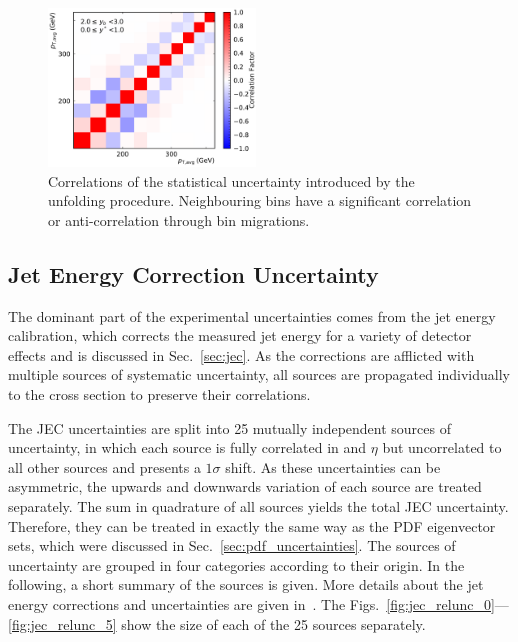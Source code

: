 \begin{figure}[htbp]
    \includegraphics[width=0.49\textwidth]{figures/measurement/unf_nlo_corr_yb2ys0.pdf}
    \caption[Correlations of statistical uncertainty]{Correlations of the
        statistical uncertainty introduced by the unfolding procedure.
        Neighbouring bins have a significant correlation or anti-correlation
        through bin migrations.}
    \label{fig:corr_unfolding_nlo}
\end{figure}

\subsection{Jet Energy Correction Uncertainty}

The dominant part of the experimental uncertainties comes from the jet energy
calibration, which corrects the measured jet energy for a variety of detector
effects and is discussed in Sec.~\ref{sec:jec}. As the corrections are afflicted
with multiple sources of systematic uncertainty, all sources are propagated
individually to the cross section to preserve their correlations.

The JEC uncertainties are split into 25 mutually independent sources of
uncertainty, in which each source is fully correlated in \pt and $\eta$
but uncorrelated to all other sources and presents a $1\sigma$
shift. As these uncertainties can be asymmetric, the upwards and downwards
variation of each source are treated separately. The sum in quadrature of all
sources yields the total JEC uncertainty. Therefore, they can be treated
in exactly the same way as the PDF eigenvector sets, which were discussed in
Sec.~\ref{sec:pdf_uncertainties}. The sources of uncertainty are grouped in four
categories according to their origin. In the following, a short summary of the
sources is given. More details about the jet energy corrections and
uncertainties are given in~\cite{jec_paper}. The
Figs.~\ref{fig:jec_relunc_0}---\ref{fig:jec_relunc_5} show the size of each of
the 25 sources separately.

